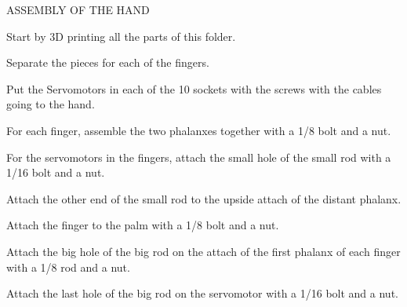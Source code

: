 A\+S\+S\+E\+M\+B\+LY OF T\+HE H\+A\+ND


\begin{DoxyEnumerate}
\item Start by 3D printing all the parts of this folder.
\item Separate the pieces for each of the fingers.
\item Put the Servomotors in each of the 10 sockets with the screws with the cables going to the hand.
\item For each finger, assemble the two phalanxes together with a 1/8\textquotesingle{}\textquotesingle{} bolt and a nut.
\item For the servomotors in the fingers, attach the small hole of the small rod with a 1/16\textquotesingle{}\textquotesingle{} bolt and a nut.
\item Attach the other end of the small rod to the upside attach of the distant phalanx.
\item Attach the finger to the palm with a 1/8\textquotesingle{}\textquotesingle{} bolt and a nut.
\item Attach the big hole of the big rod on the attach of the first phalanx of each finger with a 1/8\textquotesingle{}\textquotesingle{} rod and a nut.
\item Attach the last hole of the big rod on the servomotor with a 1/16\textquotesingle{}\textquotesingle{} bolt and a nut. 
\end{DoxyEnumerate}